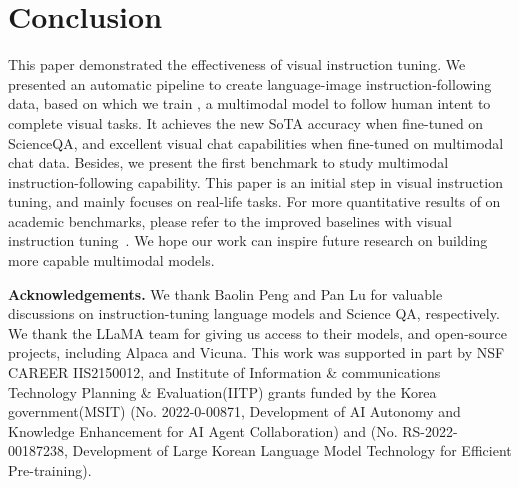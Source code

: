 \section{Conclusion}

This paper demonstrated the effectiveness of visual instruction tuning.
We presented an automatic pipeline to create language-image instruction-following data, based on which we train \shortname{}, a multimodal model to follow human intent to complete visual tasks. It achieves the new SoTA accuracy when fine-tuned on ScienceQA, and excellent visual chat capabilities when fine-tuned on multimodal chat data.
Besides, we present the first benchmark to study multimodal instruction-following capability.
This paper is an initial step in visual instruction tuning, and mainly focuses on real-life tasks. For more quantitative results of \shortname{} on academic benchmarks, please refer to the improved baselines with visual instruction tuning~\cite{liu2023improvedllava}. We hope our work can inspire future research on building more capable multimodal models.

\textbf{Acknowledgements.} 
We thank Baolin Peng and Pan Lu for valuable discussions on instruction-tuning language models and Science QA, respectively. 
We thank the LLaMA team for giving us access to their models, and open-source projects, including Alpaca and Vicuna.
This work was supported in part by NSF CAREER IIS2150012, and Institute of Information \& communications Technology Planning \& Evaluation(IITP) grants funded by the Korea government(MSIT) (No. 2022-0-00871, Development of AI Autonomy and Knowledge Enhancement for AI Agent Collaboration) and (No. RS-2022-00187238, Development of Large Korean Language Model Technology for Efficient Pre-training).